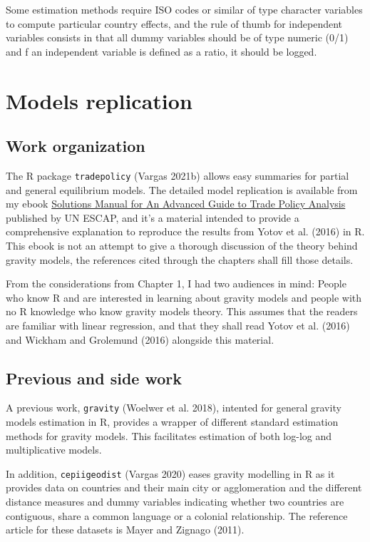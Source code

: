 \documentclass[12pt,reqno,oneside,pdftex]{formato-puc/puctesis} %
\begin{document}
Some estimation methods require ISO codes or similar of type character
variables to compute particular country effects, and the rule of thumb
for independent variables consists in that all dummy variables should be
of type numeric (0/1) and f an independent variable is defined as a
ratio, it should be logged.

\hypertarget{models-replication}{%
\section{Models replication}\label{models-replication}}

\hypertarget{work-organization}{%
\subsection{Work organization}\label{work-organization}}

The R package \texttt{tradepolicy} (Vargas 2021b) allows easy summaries
for partial and general equilibrium models. The detailed model
replication is available from my ebook
\href{https://r.tiid.org/R_structural_gravity/}{Solutions Manual for An
Advanced Guide to Trade Policy Analysis} published by UN ESCAP, and it's
a material intended to provide a comprehensive explanation to reproduce
the results from Yotov et al. (2016) in R. This ebook is not an attempt
to give a thorough discussion of the theory behind gravity models, the
references cited through the chapters shall fill those details.

From the considerations from Chapter 1, I had two audiences in mind:
People who know R and are interested in learning about gravity models
and people with no R knowledge who know gravity models theory. This
assumes that the readers are familiar with linear regression, and that
they shall read Yotov et al. (2016) and Wickham and Grolemund (2016)
alongside this material.

\hypertarget{previous-and-side-work}{%
\subsection{Previous and side work}\label{previous-and-side-work}}

A previous work, \texttt{gravity} (Woelwer et al. 2018), intented for
general gravity models estimation in R, provides a wrapper of different
standard estimation methods for gravity models. This facilitates
estimation of both log-log and multiplicative models.

In addition, \texttt{cepiigeodist} (Vargas 2020) eases gravity modelling
in R as it provides data on countries and their main city or
agglomeration and the different distance measures and dummy variables
indicating whether two countries are contiguous, share a common language
or a colonial relationship. The reference article for these datasets is
Mayer and Zignago (2011).
\end{document}
